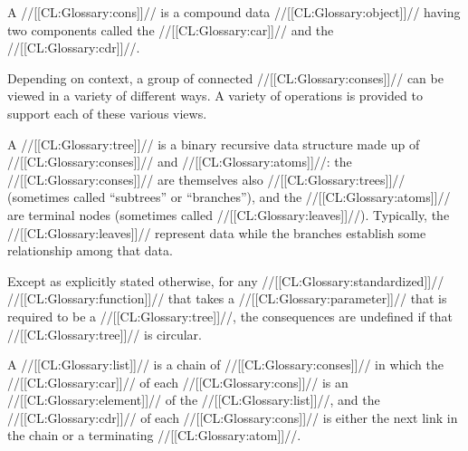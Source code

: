 

A //[[CL:Glossary:cons]]// is a compound data //[[CL:Glossary:object]]//  having two components called the //[[CL:Glossary:car]]// and the //[[CL:Glossary:cdr]]//.


Depending on context, a group of connected //[[CL:Glossary:conses]]// can be viewed in a variety of different ways.  A variety of operations is provided to support each of these various views.


A //[[CL:Glossary:tree]]// is a binary recursive data structure made up of //[[CL:Glossary:conses]]// and //[[CL:Glossary:atoms]]//: the //[[CL:Glossary:conses]]// are themselves also //[[CL:Glossary:trees]]// (sometimes called ``subtrees'' or ``branches''), and the //[[CL:Glossary:atoms]]// are terminal nodes (sometimes called //[[CL:Glossary:leaves]]//).  Typically, the //[[CL:Glossary:leaves]]// represent data while the branches  establish some relationship among that data.



 Except as explicitly stated otherwise, for any //[[CL:Glossary:standardized]]// //[[CL:Glossary:function]]// that takes a //[[CL:Glossary:parameter]]// that is required to be a //[[CL:Glossary:tree]]//, the consequences are undefined if that //[[CL:Glossary:tree]]// is circular.

\endsubsubsection%

\endsubsection%


A //[[CL:Glossary:list]]// is a chain of //[[CL:Glossary:conses]]// in which the //[[CL:Glossary:car]]// of each //[[CL:Glossary:cons]]// is an //[[CL:Glossary:element]]// of the //[[CL:Glossary:list]]//,  and the //[[CL:Glossary:cdr]]// of each //[[CL:Glossary:cons]]// is either the next link in the chain or a terminating //[[CL:Glossary:atom]]//.  

